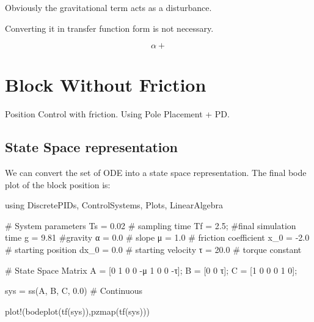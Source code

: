 \documentclass[
  8pt,
  a4paper,
]{book}
\newenvironment{Shaded}{\begin{snugshade}}{\end{snugshade}}
\newcommand{\BuiltInTok}[1]{\textcolor[rgb]{0.00,0.23,0.31}{#1}}
\newcommand{\CommentTok}[1]{\textcolor[rgb]{0.37,0.37,0.37}{#1}}
\newcommand{\FloatTok}[1]{\textcolor[rgb]{0.68,0.00,0.00}{#1}}
\newcommand{\FunctionTok}[1]{\textcolor[rgb]{0.28,0.35,0.67}{#1}}
\newcommand{\ImportTok}[1]{\textcolor[rgb]{0.00,0.46,0.62}{#1}}
\newcommand{\NormalTok}[1]{\textcolor[rgb]{0.00,0.23,0.31}{#1}}
\newcommand{\OperatorTok}[1]{\textcolor[rgb]{0.37,0.37,0.37}{#1}}
\begin{document}
Obviously the gravitational term acts as a disturbance.

Converting it in transfer function form is not necessary.

\[
\alpha +
\]

\chapter{Block Without Friction}\label{block-without-friction}

Position Control with friction. Using Pole Placement + PD.

\hfill\break

\section{State Space representation}\label{state-space-representation}

We can convert the set of ODE into a state space representation. The
final bode plot of the block position is:

\begin{Shaded}
\begin{Highlighting}[]
\ImportTok{using} \BuiltInTok{DiscretePIDs}\NormalTok{, }\BuiltInTok{ControlSystems}\NormalTok{, }\BuiltInTok{Plots}\NormalTok{, }\BuiltInTok{LinearAlgebra}

\CommentTok{\# System parameters}
\NormalTok{Ts }\OperatorTok{=} \FloatTok{0.02} \CommentTok{\# sampling time}
\NormalTok{Tf }\OperatorTok{=} \FloatTok{2.5}\NormalTok{; }\CommentTok{\#final simulation time}
\NormalTok{g }\OperatorTok{=} \FloatTok{9.81} \CommentTok{\#gravity}
\NormalTok{α }\OperatorTok{=} \FloatTok{0.0} \CommentTok{\# slope}
\NormalTok{μ }\OperatorTok{=} \FloatTok{1.0} \CommentTok{\# friction coefficient}
\NormalTok{x\_0 }\OperatorTok{=} \OperatorTok{{-}}\FloatTok{2.0} \CommentTok{\# starting position}
\NormalTok{dx\_0 }\OperatorTok{=} \FloatTok{0.0} \CommentTok{\# starting velocity}
\NormalTok{τ }\OperatorTok{=} \FloatTok{20.0} \CommentTok{\# torque constant }

\CommentTok{\# State Space Matrix}
\NormalTok{A }\OperatorTok{=}\NormalTok{ [}\FloatTok{0} \FloatTok{1} \FloatTok{0}
    \FloatTok{0} \OperatorTok{{-}}\NormalTok{μ }\FloatTok{1}
    \FloatTok{0} \FloatTok{0} \OperatorTok{{-}}\NormalTok{τ];}
\NormalTok{B }\OperatorTok{=}\NormalTok{ [}\FloatTok{0}
    \FloatTok{0}
\NormalTok{    τ];}
\NormalTok{C }\OperatorTok{=}\NormalTok{ [}\FloatTok{1} \FloatTok{0} \FloatTok{0}
    \FloatTok{0} \FloatTok{1} \FloatTok{0}\NormalTok{];}

\NormalTok{sys }\OperatorTok{=} \FunctionTok{ss}\NormalTok{(A, B, C, }\FloatTok{0.0}\NormalTok{)      }\CommentTok{\# Continuous}

\FunctionTok{plot!}\NormalTok{(}\FunctionTok{bodeplot}\NormalTok{(}\FunctionTok{tf}\NormalTok{(sys)),}\FunctionTok{pzmap}\NormalTok{(}\FunctionTok{tf}\NormalTok{(sys)))}
\end{Highlighting}
\end{Shaded}
\end{document}
